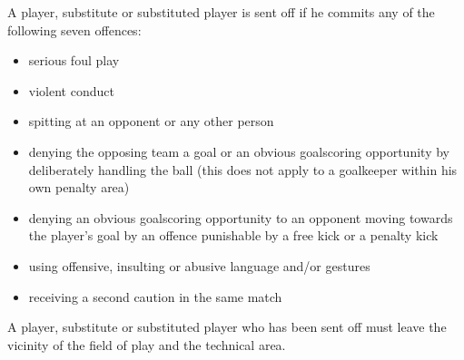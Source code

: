 {A player, substitute or substituted player is sent off if he commits any of the following seven offences:

\begin{itemize}
\item serious foul play
\item violent conduct
\item spitting at an opponent or any other person
\item denying the opposing team a goal or an obvious goalscoring opportunity by deliberately handling the ball (this does not apply to a goalkeeper within his own penalty area)
\item denying an obvious goalscoring opportunity to an opponent moving towards the player's goal by an offence punishable by a free kick or a penalty kick
\item using offensive, insulting or abusive language and/or gestures
\item receiving a second caution in the same match
\end{itemize}

\bigskip

A player, substitute or substituted player who has been sent off must leave the vicinity of the field of play and the technical area.}
